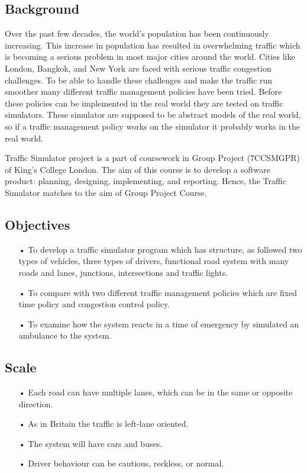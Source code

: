\documentclass[11pt]{article}
\begin{document}
\subsection{Background}

Over the past few decades, the world's population has been continuously increasing. This increase in population has resulted in overwhelming traffic which is becoming a serious problem in most major cities around the world. Cities like London, Bangkok, and New York are faced with serious traffic congestion challenges. To be able to handle these challenges and make the traffic run smoother many different traffic management policies have been tried. Before these policies can be implemented in the real world they are tested on traffic simulators. These simulator are supposed to be abstract models of the real world, so if a traffic management policy works on the simulator it probably works in the real world.

Traffic Simulator project is a part of coursework in Group Project (7CCSMGPR) of King’s College London. The aim of this course is to develop a software product: planning, designing, implementing, and reporting. Hence, the Traffic Simulator matches to the aim of Group Project Course.

\subsection{Objectives}
\begin{itemize}
\item[•] To develop a traffic simulator program which has structure, as followed two types of vehicles, three types of drivers, functional road system with many roads and lanes, junctions, intersections and traffic lights.
\item[•] To compare with two different traffic management policies which are fixed time policy and congestion control policy.
\item[•] To examine how the system reacts in a time of emergency by simulated an  ambulance to the system.
\end{itemize}

\subsection{Scale}
\begin{itemize}
\item[•] Each road can have multiple lanes, which can be in the same or opposite direction.
\item[•] As in Britain the traffic is left-lane oriented.
\item[•] The system will have cars and buses.
\item[•] Driver behaviour can be cautious, reckless, or normal.
\end{itemize}
\end{document}
